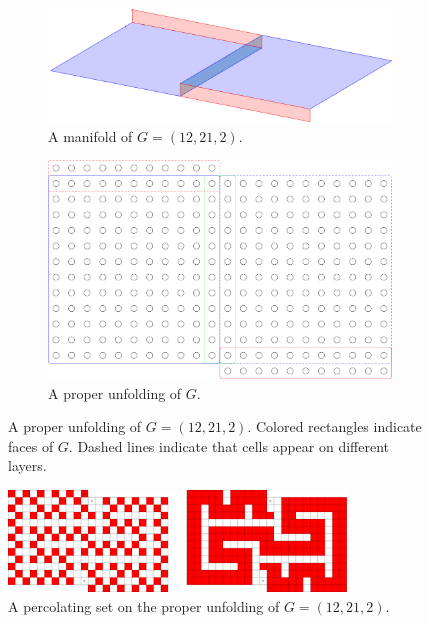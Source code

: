 \begin{figure}[]
\centering
\begin{subfigure}{0.45\textwidth}
	\includegraphics[width=\textwidth]{figures/7/12x21x2_manifold_3d.pdf}
	\caption{A manifold of $G= (12,21,2)$.}
	\label{}
\end{subfigure} \hfill%
\begin{subfigure}{0.45\textwidth}
	\includegraphics[width=\textwidth]{figures/7/12x21x2_unfolded.pdf}
	\caption{A proper unfolding of $G$.}
	\label{}
\end{subfigure}
\caption{A proper unfolding of $G= (12,21,2)$. Colored rectangles indicate faces of $G$. Dashed lines indicate that cells appear on different layers. }
\label{fig:12x21x2_unfolded}
\end{figure} 

\begin{figure}[]
\centering
\includegraphics[width=0.8\textwidth]{figures/7/12x21x2_unfolded_lethal.pdf}
\caption{A percolating set on the proper unfolding of $G= (12,21,2)$.}
\label{fig:12x21x2_unfolded_lethal}
\end{figure} 

